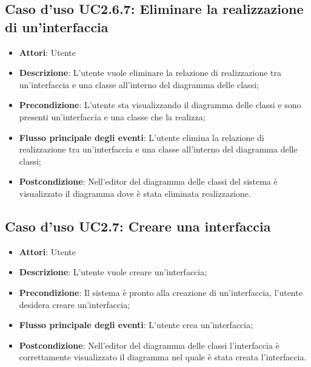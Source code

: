 \documentclass[../AnalisiDeiRequisiti.tex]{subfiles}
\begin{document}
		\subsection{Caso d'uso UC2.6.7: Eliminare la realizzazione di un'interfaccia}
		\begin{itemize}
			\item \textbf{Attori}: Utente
			\item \textbf{Descrizione}: L'utente vuole eliminare la relazione di realizzazione tra un'interfaccia e una classe all'interno del diagramma delle classi;
			\item \textbf{Precondizione}: L'utente sta visualizzando il diagramma delle classi e sono presenti un'interfaccia e una classe che la realizza;
			\item \textbf{Flusso principale degli eventi}: L'utente elimina la relazione di realizzazione tra un'interfaccia e una classe all'interno del diagramma delle classi;
			\item \textbf{Postcondizione}: Nell'editor del diagramma delle classi del sistema è visualizzato il diagramma dove è stata eliminata realizzazione.
		\end{itemize}
		\subsection{Caso d'uso UC2.7: Creare una interfaccia}
		\begin{itemize}
			\item \textbf{Attori}: Utente
			\item \textbf{Descrizione}: L'utente vuole creare un'interfaccia;
			\item \textbf{Precondizione}: Il sistema è pronto alla creazione di un'interfaccia, l'utente desidera creare un'interfaccia;
			\item \textbf{Flusso principale degli eventi}: L'utente crea un'interfaccia;
			\item \textbf{Postcondizione}: Nell'editor del diagramma delle classi l'interfaccia è correttamente visualizzato il diagramma nel quale è stata creata l'interfaccia.
		\end{itemize}
\end{document}
